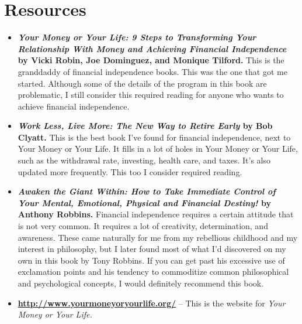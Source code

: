 \section{Resources}
\begin{itemize}
\item \textbf{\emph{Your Money or Your Life: 9 Steps to Transforming Your Relationship With Money and Achieving Financial Independence} by Vicki Robin, Joe Dominguez, and Monique Tilford.} This is the granddaddy of financial independence books. This was the one that got me started. Although some of the details of the program in this book are problematic, I still consider this required reading for anyone who wants to achieve financial independence.

\item \textbf{\emph{Work Less, Live More: The New Way to Retire Early} by Bob Clyatt.} This is the best book I've found for financial independence, next to Your Money or Your Life. It fills in a lot of holes in Your Money or Your Life, such as the withdrawal rate, investing, health care, and taxes. It's also updated more frequently. This too I consider required reading.

\item \textbf{\emph{Awaken the Giant Within: How to Take Immediate Control of Your Mental, Emotional, Physical and Financial Destiny!} by Anthony Robbins.} Financial independence requires a certain attitude that is not very common. It requires a lot of creativity, determination, and awareness. These came naturally for me from my rebellious childhood and my interest in philosophy, but I later found most of what I'd discovered on my own in this book by Tony Robbins. If you can get past his excessive use of exclamation points and his tendency to commoditize common philosophical and psychological concepts, I would definitely recommend this book.

\item \textbf{\url{http://www.yourmoneyoryourlife.org/}} -- This is the website for \emph{Your Money or Your Life.}
\end{itemize}
